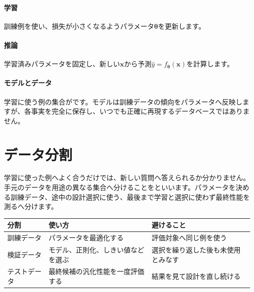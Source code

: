 \par
\endgroup
\medskip
\begingroup
\paragraph{学習}
        訓練例を使い、損失が小さくなるようパラメータ$\boldsymbol{\theta}$を更新します。

\paragraph{推論}
        学習済みパラメータを固定し、新しい$\mathbf{x}$から予測$\hat{y}=f_{\boldsymbol{\theta}}(\mathbf{x})$を計算します。

\par
\endgroup
  \vspace{4mm}
\paragraph{モデルとデータ}
    学習に使う例の集合がです。モデルは訓練データの傾向をパラメータへ反映しますが、各事実を完全に保存し、いつでも正確に再現するデータベースではありません。

\par
\endgroup


\section{データ分割}
\label{sec:06-machine-learning-06}

学習に使った例へよく合うだけでは、新しい質問へ答えられるか分かりません。手元のデータを用途の異なる集合へ分けることをといいます。パラメータを決める訓練データ、途中の設計選択に使う、最後まで学習と選択に使わず最終性能を測るへ分けます。

\begingroup
  \noindent
  \begin{tabularx}{\textwidth}{@{}lYY@{}}
    \toprule
    分割 & 使い方 & 避けること\\
    \midrule
    訓練データ & パラメータを最適化する & 評価対象へ同じ例を使う\\
    検証データ & モデル、正則化、しきい値などを選ぶ & 選択を繰り返した後も未使用とみなす\\
    テストデータ & 最終候補の汎化性能を一度評価する & 結果を見て設計を直し続ける\\
    \bottomrule
  \end{tabularx}
  \vspace{4mm}

